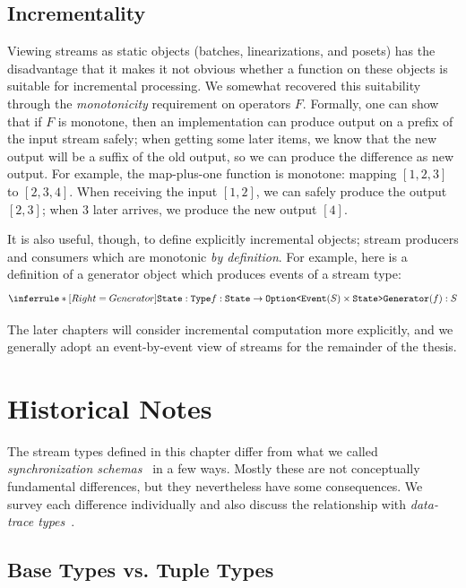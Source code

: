 \subsection{Incrementality}
\label{sec:incrementality-discussion}

Viewing streams as static objects (batches, linearizations, and posets)
has the disadvantage that it makes it not obvious whether a function on these objects is suitable for incremental processing.
We somewhat recovered this suitability through the \emph{monotonicity} requirement on operators $F$.
Formally, one can show that if $F$ is monotone, then an implementation can
produce output on a prefix of the input stream safely; when getting some later items, we know that the new output will be a suffix of the old output, so we can produce the difference as new output. For example, the map-plus-one function is monotone: mapping $[1, 2, 3]$ to $[2, 3, 4]$. When receiving the input $[1, 2]$, we can safely produce the output $[2, 3]$; when $3$ later arrives, we produce the new output $[4]$.

It is also useful, though, to define explicitly incremental objects; stream producers and consumers which are monotonic \emph{by definition}.
For example, here is a definition of a generator object which produces events of a stream type:
\[
\inference[Generator]
{
  \code{State}: \code{Type} \\
  f: \code{State} \to \code{Option<}\code{Event}(S) \times \code{State>}
}
{
  \code{Generator}(f): S
}
\]

The later chapters will consider incremental computation more explicitly, and we generally adopt an event-by-event view of streams for the remainder of the thesis.

\section{Historical Notes}
\label{sec:historical}

The stream types defined in this chapter differ from what we called \emph{synchronization schemas}~
in a few ways. Mostly these are not conceptually fundamental differences, but they nevertheless have some consequences. We survey each difference individually and also discuss the relationship with \emph{data-trace types}~.

\subsection{Base Types vs. Tuple Types}

